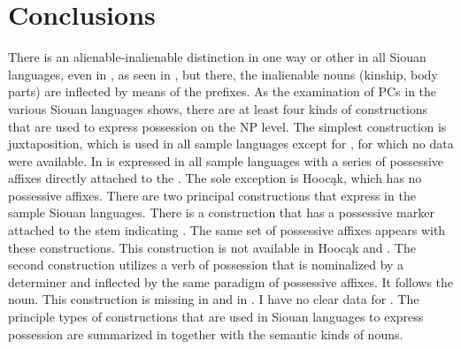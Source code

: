 \documentclass[output=paper]{LSP/langsci}
\begin{document}
\section{Conclusions}
There is an alienable-inalienable distinction in one way or other in all Siouan languages, even in , as seen in , but there, the inalienable nouns (kinship, body parts) are inflected by means of the  prefixes. As the examination of PCs in the various Siouan languages shows, there are at least four kinds of constructions that are used to express possession on the NP level. The simplest construction is  juxtaposition, which is used in all sample languages except for , for which no data were available. In is expressed in all sample languages with a series of possessive affixes directly attached to the . The sole exception is Hoocąk, which has no possessive affixes. There are two principal constructions that express  in the sample Siouan languages. There is a construction that has a possessive marker attached to the stem indicating . The same set of possessive affixes appears with these constructions. This construction is not available in Hoocąk and . The second construction utilizes a verb of possession that is nominalized by a determiner and inflected by the same paradigm of possessive affixes. It follows the  noun. This construction is missing in  and in . I have no clear data for . The principle types of constructions that are used in Siouan languages to express possession are summarized in  together with the semantic kinds of  nouns. 
\end{document}
